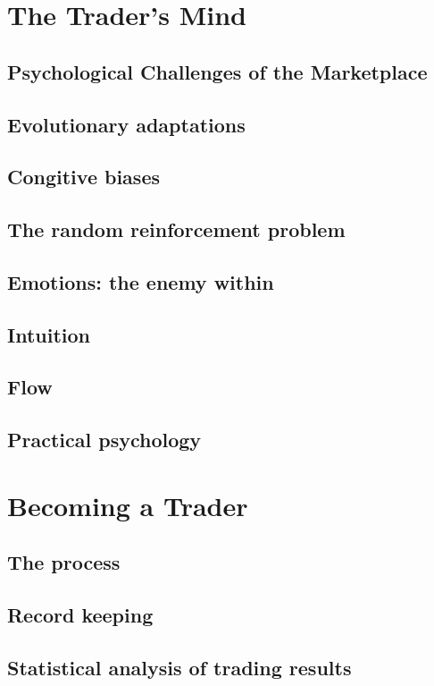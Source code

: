 \documentclass[10pt,twocolumn]{article}
\begin{document}
\section{The Trader's Mind}
\subsection{Psychological Challenges of the Marketplace}
\subsection{Evolutionary adaptations}
\subsection{Congitive biases}
\subsection{The random reinforcement problem}
\subsection{Emotions: the enemy within}
\subsection{Intuition}
\subsection{Flow}
\subsection{Practical psychology}

\section{Becoming a Trader}
\subsection{The process}
\subsection{Record keeping}
\subsection{Statistical analysis of trading results}
\end{document}
